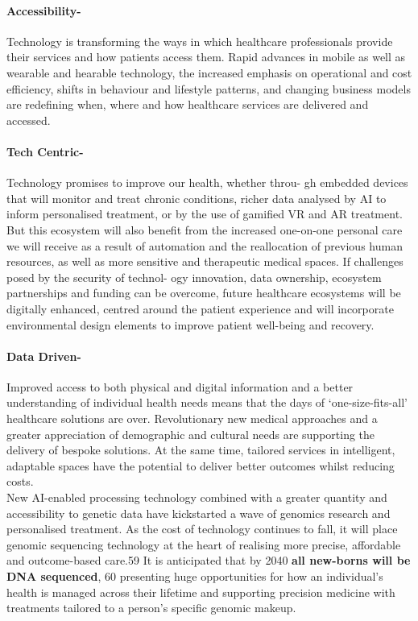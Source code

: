 \documentclass[a4paper,12pt]{extarticle}
\begin{document}
\paragraph{Accessibility-}

Technology is transforming the ways in which healthcare professionals provide their services and how patients access them. Rapid advances in mobile as well as wearable and hearable technology, the increased emphasis on operational and cost efficiency, shifts in behaviour and lifestyle patterns, and changing business models are redefining when, where and how healthcare services are delivered and accessed.
    
\paragraph{Tech Centric-}

Technology promises to improve our health, whether throu- gh embedded devices that will monitor and treat chronic conditions, richer data analysed by AI to inform personalised treatment, or by the use of gamified VR and AR treatment. But this ecosystem will also benefit from the increased one-on-one personal care we will receive as a result of automation and the reallocation of previous human
resources, as well as more sensitive and therapeutic medical spaces.
If challenges posed by the security of technol- ogy innovation, data ownership, ecosystem partnerships and funding can be overcome, future healthcare ecosystems will be digitally enhanced, centred around the patient experience and will incorporate environmental design elements to improve patient well-being and recovery.

\paragraph{Data Driven-} Improved access to both physical and digital information and a better understanding of individual health needs means that the days of ‘one-size-fits-all’ healthcare solutions are over. Revolutionary new medical approaches and a greater appreciation of demographic and cultural needs are supporting the delivery of bespoke solutions. At the same time, tailored services in intelligent, adaptable spaces have the potential to deliver better outcomes whilst reducing costs. \\

New AI-enabled processing technology combined with a greater quantity and accessibility to genetic data have kickstarted a wave of genomics research and personalised treatment. As the cost of technology continues to fall, it will place genomic sequencing technology at the heart of realising more precise, affordable and outcome-based care.59 It is anticipated that by 2040 \textbf{all new-borns will be DNA sequenced}, 60 presenting huge opportunities for how an individual’s health is managed across their lifetime and supporting precision medicine with treatments tailored to
a person’s specific genomic makeup.
\end{document}
